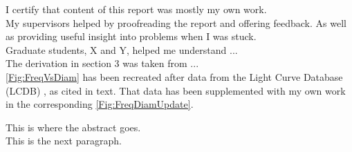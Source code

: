 \documentclass{UCreport}
\begin{document}




\buildmargins %
\buildcover %



\declaration

I certify that content of this report was mostly my own work.
\\

My supervisors helped by proofreading the report and offering feedback. As well as providing useful insight into problems when I was stuck.\\

Graduate students, X and Y, helped me understand ... \\

The derivation in section 3 was taken from ... \\

\autoref{Fig:FreqVsDiam} has been recreated after data from the Light Curve Database (LCDB) \citet{Warner2009}, as cited in text. That data has been supplemented with my own work in the corresponding \autoref{Fig:FreqDiamUpdate}.

\vspace{2cm}
\begin{centering}
  \textbf{\student}\par
\end{centering}

\newpage


\abstract

This is where the abstract goes. \\

This is the next paragraph.





\newpage
\end{document}
